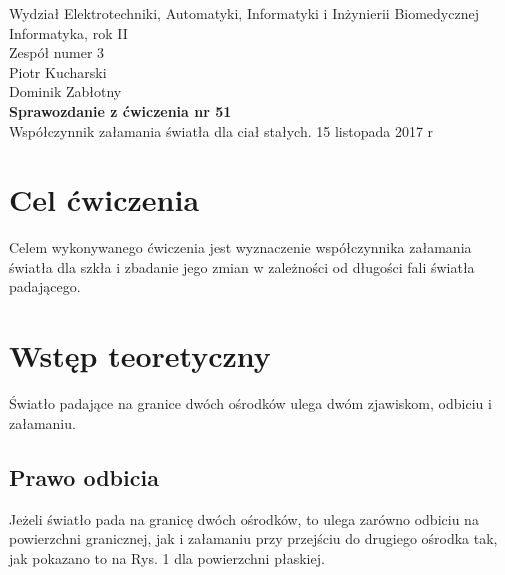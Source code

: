 \documentclass[a4paper,12pts]{article}
\begin{document}
	\thispagestyle{empty}
	\begin{flushleft}
		Wydział Elektrotechniki, Automatyki, Informatyki i Inżynierii Biomedycznej \\
		Informatyka, rok II \\
		Zespół numer 3 \\
		Piotr Kucharski \\
		Dominik Zabłotny \\
		\vspace*{\fill}
		{\large \textbf{Sprawozdanie z ćwiczenia nr 51} } \\
		Współczynnik załamania światła dla ciał stałych.		
		\vfill	
		15 listopada 2017 r
	\end{flushleft}
	
	\newpage
	
	
	\section{Cel ćwiczenia}
	
	Celem wykonywanego ćwiczenia jest wyznaczenie współczynnika załamania światła dla szkła i zbadanie jego zmian w zależności od długości fali światła padającego.

	
	\section{Wstęp teoretyczny}
	
	Światło padające na granice dwóch ośrodków ulega dwóm zjawiskom, odbiciu i załamaniu.
	
	\subsection{Prawo odbicia}
	
	Jeżeli światło pada na granicę dwóch ośrodków, to ulega zarówno odbiciu na powierzchni granicznej, jak i załamaniu przy przejściu do drugiego ośrodka tak, jak pokazano to na Rys. 1 dla powierzchni płaskiej.
	
\end{document}
